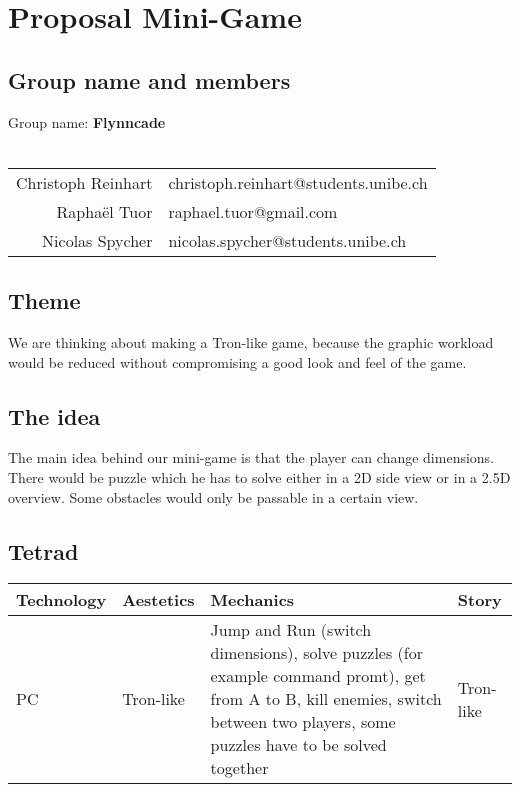 \documentclass[a4paper, 10pt]{article}
\begin{document}
	\section{Proposal Mini-Game}
	
	\subsection{Group name and members}	
	
	Group name: \textbf{Flynncade}	
	\\
	\\
	\begin{tabular}{rl}
		Christoph Reinhart  & christoph.reinhart@students.unibe.ch\\
		Raphaël Tuor  & raphael.tuor@gmail.com\\
		Nicolas Spycher & nicolas.spycher@students.unibe.ch
	\end{tabular}
	
	\subsection{Theme}
	\par{We are thinking about making a Tron-like game, because the graphic workload would be reduced without compromising a good look and feel of the game.}
	
	\subsection{The idea}
	\par{The main idea behind our mini-game is that the player can change dimensions. There would be puzzle which he has to solve either in a 2D side view or in a 2.5D overview. Some obstacles would only be passable in a certain view.}
	
	\subsection{Tetrad}
	\vspace{10pt}
	\begin{tabular}{ l | l | p{5cm} | p{2cm}}
		\textbf{Technology} & \textbf{Aestetics} & \textbf{Mechanics} & \textbf{Story} \\ \hline
		PC & Tron-like & Jump and Run (switch dimensions), solve puzzles (for example command promt), get from A to B, kill enemies, switch between two players, some puzzles have to be solved together & Tron-like \\
	\end{tabular}
	
\end{document}
